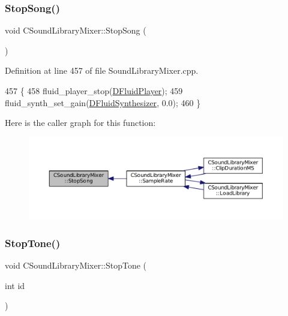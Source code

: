 \subsubsection{\texorpdfstring{Stop\+Song()}{StopSong()}}
{\footnotesize\ttfamily void C\+Sound\+Library\+Mixer\+::\+Stop\+Song (\begin{DoxyParamCaption}{ }\end{DoxyParamCaption})}



Definition at line 457 of file Sound\+Library\+Mixer.\+cpp.


\begin{DoxyCode}
457                                  \{
458     fluid\_player\_stop(\hyperlink{classCSoundLibraryMixer_a6773ddf83ef86bc27598f6c5cee61d9c}{DFluidPlayer});
459     fluid\_synth\_set\_gain(\hyperlink{classCSoundLibraryMixer_a6c1663c381dbf2aa18c82a23141f409c}{DFluidSynthesizer}, 0.0);
460 \}
\end{DoxyCode}
Here is the caller graph for this function\+:
\nopagebreak
\begin{figure}[H]
\begin{center}
\leavevmode
\includegraphics[width=350pt]{classCSoundLibraryMixer_a13fdebfbc5fdee60067c38a3c60dd2a9_icgraph}
\end{center}
\end{figure}
\hypertarget{classCSoundLibraryMixer_ab57bc3217de14130ed95c48223351ce3}{}\label{classCSoundLibraryMixer_ab57bc3217de14130ed95c48223351ce3} 
\subsubsection{\texorpdfstring{Stop\+Tone()}{StopTone()}}
{\footnotesize\ttfamily void C\+Sound\+Library\+Mixer\+::\+Stop\+Tone (\begin{DoxyParamCaption}\item[{int}]{id }\end{DoxyParamCaption})}



